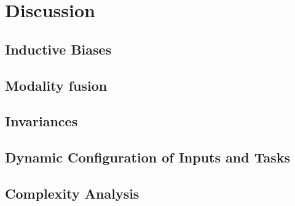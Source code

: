 \section{Discussion}

\subsection{Inductive Biases}

\subsection{Modality fusion}

\subsection{Invariances}

\subsection{Dynamic Configuration of Inputs and Tasks}

 \subsection{Complexity Analysis}
